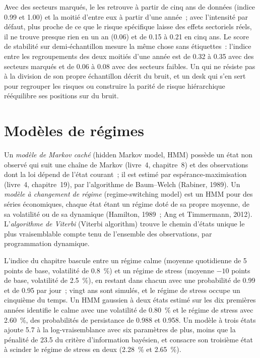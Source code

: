 Avec des secteurs marqués, le  les retrouve à partir de cinq ans de données (indice 0.99 et 1.00) et la moitié d'entre eux à
partir d'une année~; avec l'intensité par défaut, plus proche de ce que le risque spécifique laisse des effets sectoriels réels, il ne trouve presque
rien en un an (0.06) et de 0.15 à 0.21 en cinq ans. Le score de stabilité sur demi-échantillon mesure la même chose sans étiquettes~:
l'indice entre les regroupements des deux moitiés d'une année est de 0.32 à 0.35 avec des secteurs marqués et de 0.06 à 0.08 avec des secteurs faibles.
Un  qui ne résiste pas à la division de son propre échantillon décrit du bruit, et un desk qui s'en sert pour regrouper les risques ou
construire la parité de risque hiérarchique rééquilibre ses positions sur du bruit.

\section{Modèles de régimes}

\begin{definition}\label{def:ml:clustering-regimes-and-anomaly-detection:hmm}
Un \emph{modèle de Markov caché} (hidden Markov model, HMM) possède un état non observé qui suit une chaîne de Markov (livre~4,
chapitre~8) et des observations dont la loi dépend de l'état courant~; il est estimé par espérance-maximisation (livre~4,
chapitre~19), par l'algorithme de Baum--Welch (Rabiner, 1989). Un \emph{modèle à changement de régime} (regime-switching model) est un HMM
pour des séries économiques, chaque état étant un régime doté de sa propre moyenne, de sa volatilité ou de sa dynamique (Hamilton, 1989~; Ang et Timmermann, 2012).
L'\emph{algorithme de Viterbi} (Viterbi algorithm) trouve le chemin d'états unique le plus vraisemblable compte tenu de l'ensemble des observations,
par programmation dynamique.
\end{definition}

L'indice du chapitre bascule entre un régime calme (moyenne quotidienne de 5 points de base, volatilité de 0.8~\%) et un régime de stress (moyenne
$-10$ points de base, volatilité de 2.5~\%), en restant dans chacun avec une probabilité de 0.99 et de 0.95 par jour~; vingt ans sont simulés, et
le régime de stress occupe un cinquième du temps. Un HMM gaussien à deux états estimé sur les dix premières années identifie le calme avec une volatilité de 0.80~\% et
le régime de stress avec 2.60~\%, des probabilités de persistance de 0.988 et 0.958. Un modèle à trois états ajoute 5.7 à la log-vraisemblance avec six paramètres
de plus, moins que la pénalité de 23.5 du critère d'information bayésien, et consacre son troisième état à scinder le régime de stress en deux
(2.28~\% et 2.65~\%).

